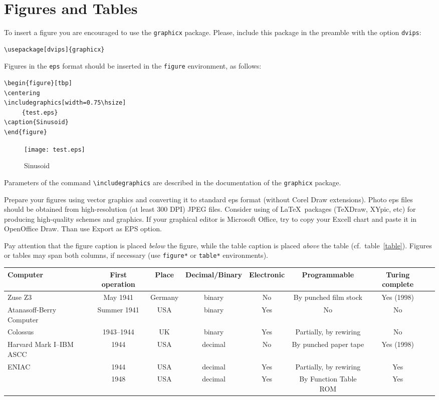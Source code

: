 \documentclass[conference]{IEEEtran}
\theoremstyle{definition}
\begin{document}
\section{Figures and Tables}
To insert a figure you are encouraged to use the  \verb|graphicx| package. Please, include this package in the preamble with the option \verb|dvips|:
\begin{verbatim}
\usepackage[dvips]{graphicx}
\end{verbatim}
Figures in the \verb|eps| format should be inserted in the \verb|figure| environment, as follows:
\begin{verbatim}
\begin{figure}[tbp]
\centering
\includegraphics[width=0.75\hsize]
     {test.eps}
\caption{Sinusoid}
\end{figure}
\end{verbatim}
%
\begin{figure}[tbp]
\centering
\texttt{[image: test.eps]}
\caption{Sinusoid}
\end{figure}
%
Parameters of the command \verb|\includegraphics| are described in the documentation of the \verb|graphicx| package.

Prepare your figures using vector graphics and converting it to standard eps format (without Corel Draw extensions). Photo eps files should be obtained from high-resolution (at least 300 DPI) JPEG files. Consider using of \LaTeX\ packages (TeXDraw, XYpic, etc) for producing high-quality schemes and graphics. If your graphical editor is Microsoft Office, try to copy your Excell chart and paste it in OpenOffice Draw. Than use Export as EPS option.


Pay attention that the figure caption is placed \emph{below} the figure, while the table caption is placed \emph{above} the table (cf.~table~\ref{table}). Figures or tables may span both columns, if necessary (use \texttt{figure*} or \texttt{table*} environments).


\begin{table*}[tbp]
\caption{Defining characteristics of five early digital computers}\label{table}
\centering
\begin{tabular}{|@{\vrule width0ptheight9pt\enspace}l|c|c|c|c|c|c|c|}\hline
\hfil\bf Computer&\bf First operation&\bf Place& \bf Decimal/Binary&\bf Electronic&\bf Programmable&\bf Turing complete\\\hline
Zuse Z3&May 1941&Germany&binary&No&By punched film stock&Yes (1998)\\\hline
Atanasoff-Berry Computer&Summer 1941&USA&binary&Yes&No&No\\\hline
Colossus&1943--1944&UK&binary&Yes&Partially, by rewiring&No\\\hline
Harvard Mark I--IBM ASCC&1944&USA&decimal&No&By punched paper tape&Yes (1998)\\\hline
\multirow{2}{*}{ENIAC}&1944&USA&decimal&Yes&Partially, by rewiring&Yes\\\cline{2-7}
&1948&USA&decimal&Yes&By Function Table ROM&Yes\\\hline
\end{tabular}
\end{table*}
\end{document}
